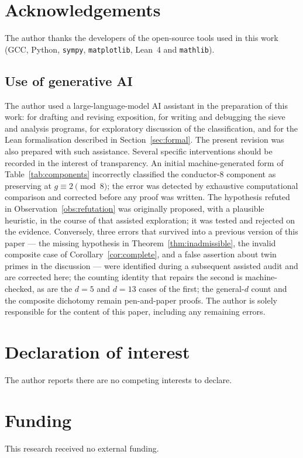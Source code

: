 \documentclass[11pt,reqno]{amsart}
\theoremstyle{plain}
\theoremstyle{definition}
\begin{document}
\section*{Acknowledgements}
The author thanks the developers of the open-source tools used in this work
(GCC, Python, \texttt{sympy}, \texttt{matplotlib}, Lean~4 and
\texttt{mathlib}).

\subsection*{Use of generative AI}
The author used a large-language-model AI assistant in the preparation of this
work: for drafting and revising exposition, for writing and debugging the
sieve and analysis programs, for exploratory discussion of the
classification, and for the Lean formalisation described in
Section~\ref{sec:formal}. The present revision was also prepared with such
assistance. Several specific interventions should be recorded in the interest
of transparency. An initial machine-generated form of
Table~\ref{tab:components} incorrectly classified the conductor-$8$ component
as preserving at $g \equiv 2 \pmod 8$; the error was detected by exhaustive
computational comparison and corrected before any proof was written. The
hypothesis refuted in Observation~\ref{obs:refutation} was originally
proposed, with a plausible heuristic, in the course of that assisted
exploration; it was tested and rejected on the evidence. Conversely, three
errors that survived into a previous version of this paper --- the missing
hypothesis in Theorem~\ref{thm:inadmissible}, the invalid composite case of
Corollary~\ref{cor:complete}, and a false assertion about twin primes in the
discussion --- were identified during a subsequent assisted audit and are
corrected here; the counting identity that repairs the second is machine-checked, as are the
$d = 5$ and $d = 13$ cases of the first; the general-$d$ count and the
composite dichotomy remain pen-and-paper proofs. The author is solely
responsible for the content of this paper, including any remaining errors.

\section*{Declaration of interest}
The author reports there are no competing interests to declare.

\section*{Funding}
This research received no external funding.
\end{document}

